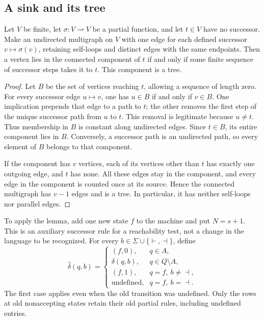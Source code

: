 \subsection{A sink and its tree}

\begin{lemma}
\label{lem:sink-tree}
Let $V$ be finite, let $\sigma:V\rightharpoonup V$ be a partial function,
and let $t\in V$ have no successor.  Make an undirected multigraph on
$V$ with one edge for each defined successor $v\mapsto\sigma(v)$,
retaining self-loops and distinct edges with the same endpoints.
Then a vertex lies in the connected component of $t$ if and only if
some finite sequence of successor steps takes it to $t$.  This
component is a tree.
\end{lemma}

\begin{proof}
Let $B$ be the set of vertices reaching $t$, allowing a sequence of
length zero.  For every successor edge $u\mapsto v$, one has
$u\in B$ if and only if $v\in B$.  One implication prepends that
edge to a path to $t$; the other removes the first step of the unique
successor path from $u$ to $t$.  This removal is legitimate because
$u\ne t$.  Thus membership in $B$ is constant along undirected edges.
Since $t\in B$, its entire component lies in $B$.  Conversely, a
successor path is an undirected path, so every element of $B$ belongs
to that component.

If the component has $v$ vertices, each of its vertices other than
$t$ has exactly one outgoing edge, and $t$ has none.  All these edges
stay in the component, and every edge in the component is counted
once at its source.  Hence the connected multigraph has $v-1$ edges
and is a tree.  In particular, it has neither self-loops nor parallel
edges.
\end{proof}

To apply the lemma, add one new state $f$ to the machine and put
$N=s+1$.  This is an auxiliary successor rule for a reachability
test, not a change in the language to be recognized.  For every
$b\in\Sigma\cup\{\vdash,\dashv\}$, define
\[
 \widehat\delta(q,b)=
 \begin{cases}
  (f,0),&q\in A,\\
  \delta(q,b),&q\in Q\setminus A,\\
  (f,1),&q=f,\ b\ne\dashv,\\
  \text{undefined},&q=f,\ b=\dashv.
 \end{cases}
\]
The first case applies even when the old transition was undefined.
Only the rows at old nonaccepting states retain their old partial
rules, including undefined entries.

